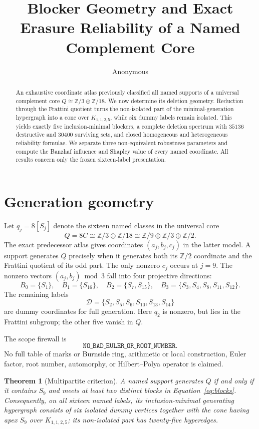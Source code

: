\documentclass[10pt]{article}
\title{Blocker Geometry and Exact Erasure Reliability of a Named Complement Core}
\author{Anonymous}
\date{}
\newtheorem{theorem}{Theorem}
\newcommand{\Z}{\mathbb Z}
\begin{document}
\maketitle

\begin{abstract}
An exhaustive coordinate atlas previously classified all named supports of a
universal complement core $Q\cong\mathbb Z/3\oplus\mathbb Z/18$.  We now
determine its deletion geometry.  Reduction through the Frattini quotient
turns the non-isolated part of the minimal-generation hypergraph into a cone
over $K_{1,1,2,5}$, while six dummy labels remain isolated.  This yields exactly five inclusion-minimal
blockers, a complete deletion spectrum with $35136$ destructive and $30400$
surviving sets, and closed homogeneous and heterogeneous reliability
formulae.  We separate three non-equivalent robustness parameters and compute
the Banzhaf influence and Shapley value of every named coordinate.  All
results concern only the frozen sixteen-label presentation.
\end{abstract}

\section{Generation geometry}
Let $q_j=8[S_j]$ denote the sixteen named classes in the universal core
\[
 Q=8C\cong\Z/3\oplus\Z/18
       \cong\Z/9\oplus\Z/3\oplus\Z/2.
\]
The exact predecessor atlas gives coordinates
$(a_j,b_j,c_j)$ in the latter model.  A support generates $Q$ precisely when
it generates both its $\Z/2$ coordinate and the Frattini quotient of its odd
part.  The only nonzero $c_j$ occurs at $j=9$.  The nonzero vectors
$(a_j,b_j)\bmod3$ fall into four projective directions:
\begin{equation}\label{eq:blocks}
 B_0=\{S_1\},\quad B_1=\{S_{16}\},\quad
 B_2=\{S_7,S_{15}\},\quad
 B_3=\{S_3,S_4,S_8,S_{11},S_{12}\}.
\end{equation}
The remaining labels
\[
 \mathcal D=\{S_2,S_5,S_6,S_{10},S_{13},S_{14}\}
\]
are dummy coordinates for full generation.  Here $q_2$ is nonzero, but lies
in the Frattini subgroup; the other five vanish in $Q$.

The scope firewall is
\[
 \texttt{NO\_BAD\_EULER\_OR\_ROOT\_NUMBER}.
\]
No full table of marks or Burnside ring, arithmetic or local construction,
Euler factor, root number, automorphy, or Hilbert--Polya operator is claimed.

\begin{theorem}[Multipartite criterion]\label{thm:criterion}
A named support generates $Q$ if and only if it contains $S_9$ and meets at
least two distinct blocks in Equation~\eqref{eq:blocks}.  Consequently, on all
sixteen named labels, its inclusion-minimal generating hypergraph consists of
six isolated dummy vertices together with the cone having apex $S_9$ over
$K_{1,1,2,5}$; its non-isolated part has twenty-five hyperedges.
\end{theorem}
\end{document}
